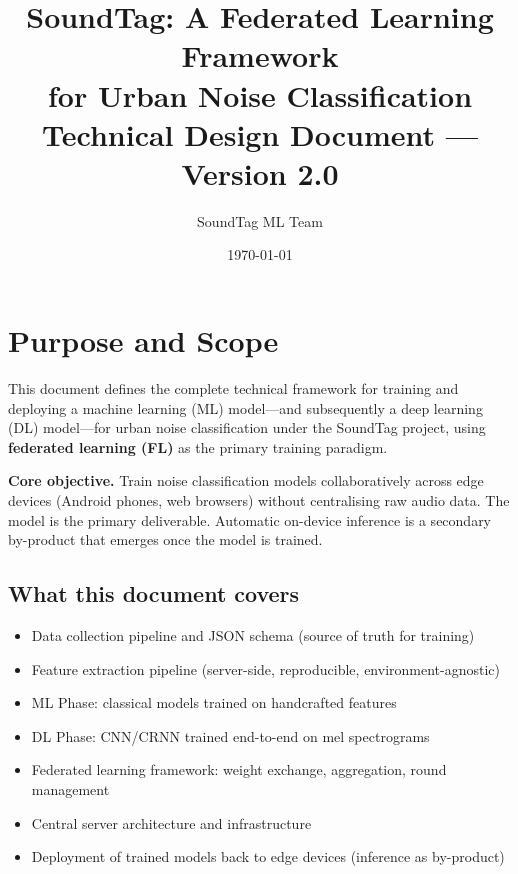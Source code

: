\documentclass[11pt,a4paper]{article}
\title{%
  \vspace{2cm}
  \Huge\textbf{SoundTag: A Federated Learning Framework} \\
  \vspace{0.4cm}
  \Large for Urban Noise Classification \\
  \vspace{0.5cm}
  \large Technical Design Document --- Version 2.0
}
\author{SoundTag ML Team}
\date{\today}
\begin{document}

\maketitle
\thispagestyle{fancy}

\newpage
\tableofcontents
\newpage

\section{Purpose and Scope}

This document defines the complete technical framework for training and deploying a
machine learning (ML) model---and subsequently a deep learning (DL) model---for urban
noise classification under the SoundTag project, using \textbf{federated learning (FL)}
as the primary training paradigm.

\begin{keybox}
\textbf{Core objective.} Train noise classification models collaboratively across
edge devices (Android phones, web browsers) without centralising raw audio data.
The model is the primary deliverable. Automatic on-device inference is a secondary
by-product that emerges once the model is trained.
\end{keybox}

\subsection{What this document covers}
\begin{itemize}[leftmargin=*,noitemsep]
  \item Data collection pipeline and JSON schema (source of truth for training)
  \item Feature extraction pipeline (server-side, reproducible, environment-agnostic)
  \item ML Phase: classical models trained on handcrafted features
  \item DL Phase: CNN/CRNN trained end-to-end on mel spectrograms
  \item Federated learning framework: weight exchange, aggregation, round management
  \item Central server architecture and infrastructure
  \item Deployment of trained models back to edge devices (inference as by-product)
\end{itemize}
\end{document}

